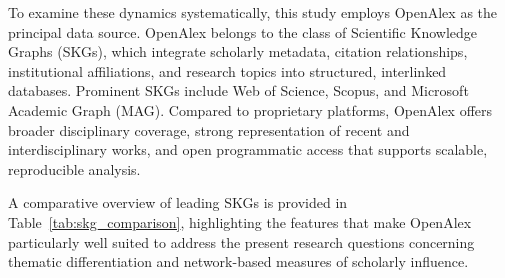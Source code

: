 \documentclass{article}
\begin{document}
To examine these dynamics systematically, this study employs OpenAlex as the principal data source. OpenAlex belongs to the class of Scientific Knowledge Graphs (SKGs), which integrate scholarly metadata, citation relationships, institutional affiliations, and research topics into structured, interlinked databases. Prominent SKGs include Web of Science, Scopus, and Microsoft Academic Graph (MAG). Compared to proprietary platforms, OpenAlex offers broader disciplinary coverage, strong representation of recent and interdisciplinary works, and open programmatic access that supports scalable, reproducible analysis. 

A comparative overview of leading SKGs is provided in Table~\ref{tab:skg_comparison}, highlighting the features that make OpenAlex particularly well suited to address the present research questions concerning thematic differentiation and network-based measures of scholarly influence.
\end{document}
